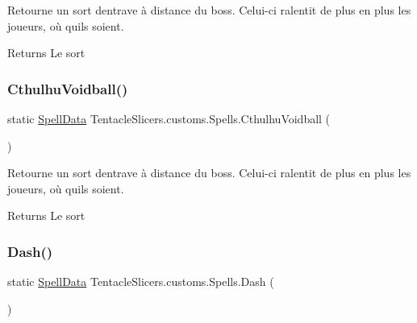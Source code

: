 Retourne un sort d\textquotesingle{}entrave à distance du boss. Celui-\/ci ralentit de plus en plus les joueurs, où qu\textquotesingle{}ils soient. 

\begin{DoxyReturn}{Returns}
Le sort 
\end{DoxyReturn}
\mbox{\label{class_tentacle_slicers_1_1customs_1_1_spells_a748b59ef695b5ffc37dc3689d335cc9b}} 
\subsubsection{\texorpdfstring{Cthulhu\+Voidball()}{CthulhuVoidball()}}
{\footnotesize\ttfamily static \hyperlink{class_tentacle_slicers_1_1spells_1_1_spell_data}{Spell\+Data} Tentacle\+Slicers.\+customs.\+Spells.\+Cthulhu\+Voidball (\begin{DoxyParamCaption}{ }\end{DoxyParamCaption})\hspace{0.3cm}{\ttfamily [static]}}



Retourne un sort d\textquotesingle{}entrave à distance du boss. Celui-\/ci ralentit de plus en plus les joueurs, où qu\textquotesingle{}ils soient. 

\begin{DoxyReturn}{Returns}
Le sort 
\end{DoxyReturn}
\mbox{\label{class_tentacle_slicers_1_1customs_1_1_spells_af747af60697de1f8dda3cbe8fe5a1c9d}} 
\subsubsection{\texorpdfstring{Dash()}{Dash()}}
{\footnotesize\ttfamily static \hyperlink{class_tentacle_slicers_1_1spells_1_1_spell_data}{Spell\+Data} Tentacle\+Slicers.\+customs.\+Spells.\+Dash (\begin{DoxyParamCaption}{ }\end{DoxyParamCaption})\hspace{0.3cm}{\ttfamily [static]}}




